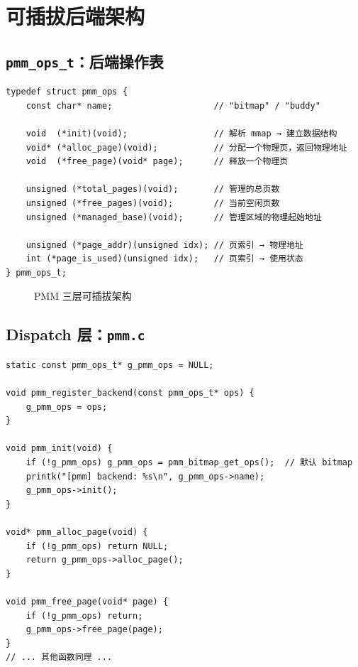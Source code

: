 \section{可插拔后端架构}

\subsection{\texttt{pmm\_ops\_t}：后端操作表}

\begin{lstlisting}[style=cstyle]
typedef struct pmm_ops {
    const char* name;                    // "bitmap" / "buddy"

    void  (*init)(void);                 // 解析 mmap → 建立数据结构
    void* (*alloc_page)(void);           // 分配一个物理页，返回物理地址
    void  (*free_page)(void* page);      // 释放一个物理页

    unsigned (*total_pages)(void);       // 管理的总页数
    unsigned (*free_pages)(void);        // 当前空闲页数
    unsigned (*managed_base)(void);      // 管理区域的物理起始地址

    unsigned (*page_addr)(unsigned idx); // 页索引 → 物理地址
    int (*page_is_used)(unsigned idx);   // 页索引 → 使用状态
} pmm_ops_t;
\end{lstlisting}

\begin{figure}[H]
  \centering
  
  \caption{PMM 三层可插拔架构}
\end{figure}

\subsection{Dispatch 层：\texttt{pmm.c}}

\begin{lstlisting}[style=cstyle]
static const pmm_ops_t* g_pmm_ops = NULL;

void pmm_register_backend(const pmm_ops_t* ops) {
    g_pmm_ops = ops;
}

void pmm_init(void) {
    if (!g_pmm_ops) g_pmm_ops = pmm_bitmap_get_ops();  // 默认 bitmap
    printk("[pmm] backend: %s\n", g_pmm_ops->name);
    g_pmm_ops->init();
}

void* pmm_alloc_page(void) {
    if (!g_pmm_ops) return NULL;
    return g_pmm_ops->alloc_page();
}

void pmm_free_page(void* page) {
    if (!g_pmm_ops) return;
    g_pmm_ops->free_page(page);
}
// ... 其他函数同理 ...
\end{lstlisting}

